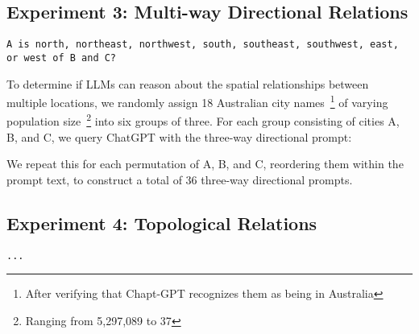 

\subsection{Experiment 3: Multi-way Directional Relations}

\begin{lstlisting}[title=text here]
    A is north, northeast, northwest, south, southeast, southwest, east, or west of B and C?
\end{lstlisting}


To determine if LLMs can reason about the spatial relationships between multiple locations, we randomly assign 18 Australian city names~\footnote{After verifying that Chapt-GPT recognizes them as being in Australia} of varying population size~\footnote{Ranging from 5,297,089 to 37} into six groups of three.
For each group consisting of cities A, B, and C, we query ChatGPT with the three-way directional prompt: 
\begin{center}
\end{center}

We repeat this for each permutation of A, B, and C, reordering them within the prompt text, to construct a total of 36 three-way directional prompts.



\subsection{Experiment 4: Topological Relations}

\begin{lstlisting}[title=text here]
    ...
\end{lstlisting}

